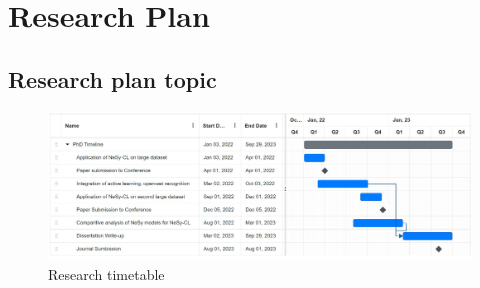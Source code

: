 \newpage

 \section{Research Plan}
 
\lipsum[5]

\lipsum[5]

\lipsum[5]

\subsection{Research plan topic}

\lipsum[5]

\lipsum[5]

\begin{figure}[h!]
\centering
\includegraphics[width=\textwidth]{Images/gantt_chart.png}
\caption{Research timetable}
\label{fig:ResearchTimetable}
\end{figure}